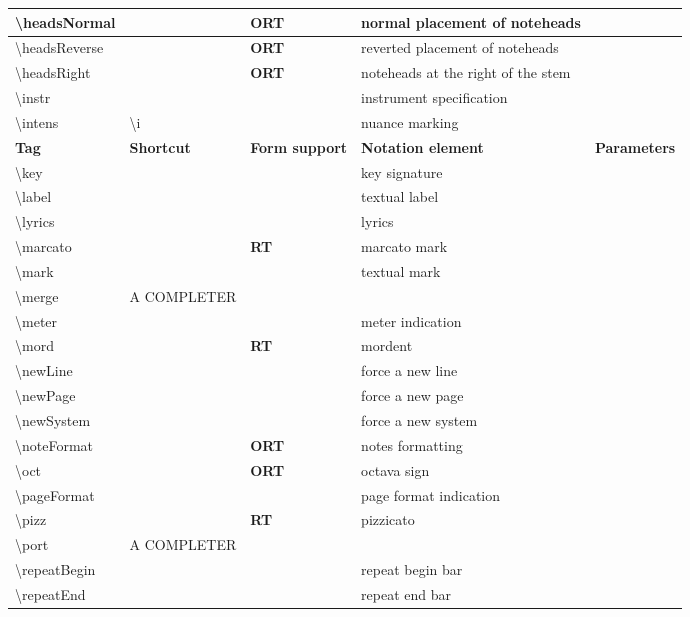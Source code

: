 \documentclass[a4paper, landscape, 11pt]{article}
\begin{document}
\begin{tabularx}{\linewidth}{lllll}
    \hline
    \textbackslash{}headsNormal&&\textbf{ORT}&normal placement of noteheads&\\
    \hline
    \textbackslash{}headsReverse&&\textbf{ORT}&reverted placement of noteheads&\\
    \hline
    \textbackslash{}headsRight&&\textbf{ORT}&noteheads at the right of the stem&\\
    \hline
    \textbackslash{}instr&&&instrument specification&\\
    \hline
    \textbackslash{}intens&\textbackslash{}i&&nuance marking&\\
    \hline
    \textbf{Tag}&\textbf{Shortcut}&\textbf{Form support}&\textbf{Notation element}&\textbf{Parameters}\\
    \hline
    \textbackslash{}key&&&key signature&\\
    \hline
    \textbackslash{}label&&&textual label&\\
    \hline
    \textbackslash{}lyrics&&&lyrics&\\
    \hline
    \textbackslash{}marcato&&\textbf{RT}&marcato mark&\\
    \hline
    \textbackslash{}mark&&&textual mark&\\
    \hline
    \textbackslash{}merge&A COMPLETER&&&\\
    \hline
    \textbackslash{}meter&&&meter indication&\\
    \hline
    \textbackslash{}mord&&\textbf{RT}&mordent&\\
    \hline
    \textbackslash{}newLine&&&force a new line&\\
    \hline
    \textbackslash{}newPage&&&force a new page&\\
    \hline
    \textbackslash{}newSystem&&&force a new system&\\
    \hline
    \textbackslash{}noteFormat&&\textbf{ORT}&notes formatting&\\
    \hline
    \textbackslash{}oct&&\textbf{ORT}&octava sign&\\
    \hline
    \textbackslash{}pageFormat&&&page format indication&\\
    \hline
    \textbackslash{}pizz&&\textbf{RT}&pizzicato&\\
    \hline
    \textbackslash{}port&A COMPLETER&&&\\
    \hline
    \textbackslash{}repeatBegin&&&repeat begin bar&\\
    \hline
    \textbackslash{}repeatEnd&&&repeat end bar&\\

\end{tabularx}
\end{document}
